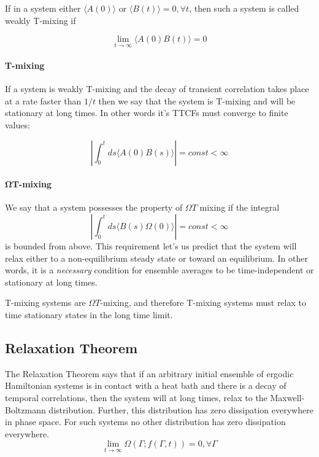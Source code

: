 \documentclass[a4paper,12pt,nofootinbib]{article}
\begin{document}
If in a system either $\langle A(0) \rangle $ or $ \langle B(t) \rangle = 0, \forall t $, then such a system is called weakly T-mixing if

\begin{equation}
  \lim_{t \to \infty} \langle A(0) B(t) \rangle = 0
\end{equation}

\paragraph{T-mixing}
If a system is weakly T-mixing and the decay of transient correlation takes place at a rate faster than $1/t$ then we say that the system is T-mixing and will be stationary at long times. In other words it's TTCFs must converge to finite values:

\begin{equation}
  \left| \int_0^t ds \langle A(0) B(s) \rangle \right| = const < \infty 
\end{equation}


\paragraph{$\bm{\Omega T}$-mixing}
We say that a system possesses the property of $\Omega T$ mixing if the integral
\begin{equation}
    \left| \int_0^t ds \langle B(s) \Omega(0) \rangle \right| = const < \infty
\end{equation}
is bounded from above. This requirement let's us predict that the system will relax either to a non-equilibrium steady state or toward an equilibrium. In other words, it is a \textit{necessary} condition for ensemble averages to be time-independent or stationary at long times.

T-mixing systems are $\Omega T$-mixing, and therefore T-mixing systems must relax to time stationary states in the long time limit.


\subsection{Relaxation Theorem}
The Relaxation Theorem says that if an arbitrary initial ensemble of ergodic Hamiltonian systems is in contact with a heat bath and there is a decay of temporal correlations, then the system will at long times, relax to the Maxwell-Boltzmann distribution. Further, this distribution has zero dissipation everywhere in phase space. For such systems no other distribution has zero dissipation everywhere.
\begin{displaymath}
  \lim_{t\to \infty } \Omega (\Gamma ;f(\Gamma ,t))=0, \forall \Gamma
\end{displaymath}
\end{document}
